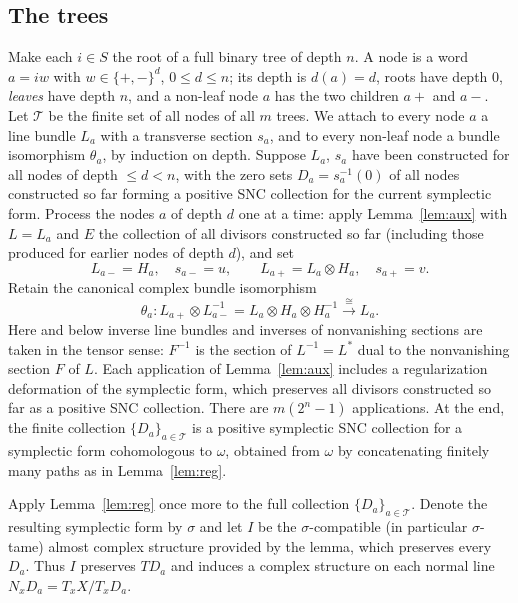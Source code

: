 \documentclass[12pt]{article}
\theoremstyle{remark}
\newcommand{\cT}{\mathcal T}
\begin{document}
\subsection*{The trees}
Make each $i\in S$ the root of a full binary tree of depth $n$. A node
is a word $a=iw$ with $w\in\{+,-\}^{d}$, $0\le d\le n$; its depth is
$d(a)=d$, roots have depth $0$, \emph{leaves} have depth $n$, and a
non-leaf node $a$ has the two children $a+$ and $a-$. Let $\cT$ be the
finite set of all nodes of all $m$ trees. We attach to every node $a$ a
line bundle $L_a$ with a transverse section $s_a$, and to every non-leaf
node a bundle isomorphism $\theta_a$, by induction on depth.
Suppose $L_a$, $s_a$ have been constructed for all nodes of depth
$\le d<n$, with the zero sets $D_a=s_a^{-1}(0)$ of all nodes constructed
so far forming a positive SNC collection for the current symplectic
form. Process the nodes $a$ of depth $d$ one at a time: apply
Lemma~\ref{lem:aux} with $L=L_a$ and $E$ the collection of all
divisors constructed so far (including those produced for earlier nodes
of depth $d$), and set
\[
 L_{a-}=H_a,\quad s_{a-}=u,\qquad
 L_{a+}=L_a\otimes H_a,\quad s_{a+}=v .
\]
Retain the canonical complex bundle isomorphism
\begin{equation}\label{eq:theta}
 \theta_a\colon L_{a+}\otimes L_{a-}^{-1}
 =L_a\otimes H_a\otimes H_a^{-1}\xrightarrow{\ \cong\ }L_a .
\end{equation}
Here and below inverse line bundles and inverses of nonvanishing
sections are taken in the tensor sense: $F^{-1}$ is the section of
$L^{-1}=L^*$ dual to the nonvanishing section $F$ of $L$. Each
application of Lemma~\ref{lem:aux} includes a regularization
deformation of the symplectic form, which preserves all divisors
constructed so far as a positive SNC collection. There are
$m(2^n-1)$ applications. At the end, the finite collection
$\{D_a\}_{a\in\cT}$ is a positive symplectic SNC collection for a
symplectic form cohomologous to $\omega$, obtained from $\omega$ by
concatenating finitely many paths as in Lemma~\ref{lem:reg}.

Apply Lemma~\ref{lem:reg} once more to the full collection
$\{D_a\}_{a\in\cT}$. Denote the resulting symplectic form by $\sigma$
and let $I$ be the $\sigma$-compatible (in particular $\sigma$-tame)
almost complex structure provided by the lemma, which preserves every
$D_a$. Thus $I$ preserves $TD_a$ and induces a complex structure on
each normal line $N_xD_a=T_xX/T_xD_a$.
\end{document}
